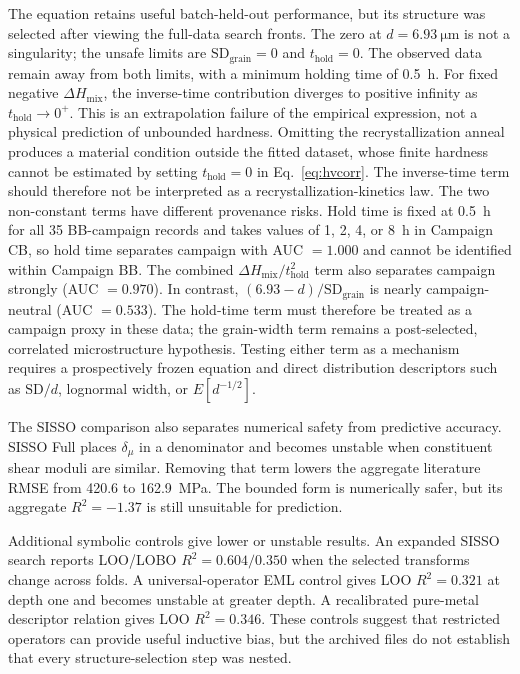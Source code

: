 \documentclass[5p,times,twocolumn]{elsarticle}
\begin{document}
The equation retains useful batch-held-out performance, but its structure was selected after viewing the full-data search fronts. The zero at $d=\SI{6.93}{\micro\meter}$ is not a singularity; the unsafe limits are $\mathrm{SD}_{\mathrm{grain}}=0$ and $t_{\mathrm{hold}}=0$. The observed data remain away from both limits, with a minimum holding time of 0.5~h. For fixed negative $\Delta H_{\mathrm{mix}}$, the inverse-time contribution diverges to positive infinity as $t_{\mathrm{hold}}\to0^+$. This is an extrapolation failure of the empirical expression, not a physical prediction of unbounded hardness. Omitting the recrystallization anneal produces a material condition outside the fitted dataset, whose finite hardness cannot be estimated by setting $t_{\mathrm{hold}}=0$ in Eq.~\eqref{eq:hvcorr}. The inverse-time term should therefore not be interpreted as a recrystallization-kinetics law. The two non-constant terms have different provenance risks. Hold time is fixed at 0.5~h for all 35 BB-campaign records and takes values of 1, 2, 4, or 8~h in Campaign CB, so hold time separates campaign with AUC $=1.000$ and cannot be identified within Campaign BB. The combined $\Delta H_{\mathrm{mix}}/t_{\mathrm{hold}}^2$ term also separates campaign strongly (AUC $=0.970$). In contrast, $(6.93-d)/\mathrm{SD}_{\mathrm{grain}}$ is nearly campaign-neutral (AUC $=0.533$). The hold-time term must therefore be treated as a campaign proxy in these data; the grain-width term remains a post-selected, correlated microstructure hypothesis. Testing either term as a mechanism requires a prospectively frozen equation and direct distribution descriptors such as $\mathrm{SD}/d$, lognormal width, or $E[d^{-1/2}]$.

The SISSO comparison also separates numerical safety from predictive accuracy. SISSO Full places $\delta_\mu$ in a denominator and becomes unstable when constituent shear moduli are similar. Removing that term lowers the aggregate literature RMSE from 420.6 to \SI{162.9}{MPa}. The bounded form is numerically safer, but its aggregate $R^2=-1.37$ is still unsuitable for prediction.

Additional symbolic controls give lower or unstable results. An expanded SISSO search reports LOO/LOBO $R^2=0.604/0.350$ when the selected transforms change across folds. A universal-operator EML control gives LOO $R^2=0.321$ at depth one and becomes unstable at greater depth. A recalibrated pure-metal descriptor relation gives LOO $R^2=0.346$. These controls suggest that restricted operators can provide useful inductive bias, but the archived files do not establish that every structure-selection step was nested.
\end{document}

